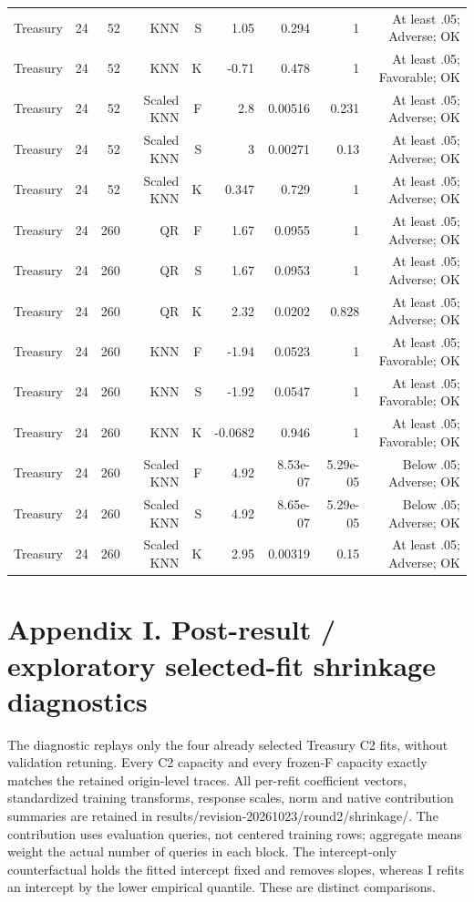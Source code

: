 \documentclass[10pt,a4paper]{article}
\begin{document}
\begin{center}
\begin{minipage}{\linewidth}
\begin{tabular}{lrrrrrrrr}
Treasury & 24 & 52 & KNN & S & 1.05 & 0.294 & 1 & At least .05; Adverse; OK \\
Treasury & 24 & 52 & KNN & K & -0.71 & 0.478 & 1 & At least .05; Favorable; OK \\
Treasury & 24 & 52 & Scaled KNN & F & 2.8 & 0.00516 & 0.231 & At least .05; Adverse; OK \\
Treasury & 24 & 52 & Scaled KNN & S & 3 & 0.00271 & 0.13 & At least .05; Adverse; OK \\
Treasury & 24 & 52 & Scaled KNN & K & 0.347 & 0.729 & 1 & At least .05; Adverse; OK \\
Treasury & 24 & 260 & QR & F & 1.67 & 0.0955 & 1 & At least .05; Adverse; OK \\
Treasury & 24 & 260 & QR & S & 1.67 & 0.0953 & 1 & At least .05; Adverse; OK \\
Treasury & 24 & 260 & QR & K & 2.32 & 0.0202 & 0.828 & At least .05; Adverse; OK \\
Treasury & 24 & 260 & KNN & F & -1.94 & 0.0523 & 1 & At least .05; Favorable; OK \\
Treasury & 24 & 260 & KNN & S & -1.92 & 0.0547 & 1 & At least .05; Favorable; OK \\
Treasury & 24 & 260 & KNN & K & -0.0682 & 0.946 & 1 & At least .05; Favorable; OK \\
Treasury & 24 & 260 & Scaled KNN & F & 4.92 & 8.53e-07 & 5.29e-05 & Below .05; Adverse; OK \\
Treasury & 24 & 260 & Scaled KNN & S & 4.92 & 8.65e-07 & 5.29e-05 & Below .05; Adverse; OK \\
Treasury & 24 & 260 & Scaled KNN & K & 2.95 & 0.00319 & 0.15 & At least .05; Adverse; OK \\
\bottomrule
\end{tabular}
\end{minipage}
\end{center}
\section*{Appendix I. Post-result / exploratory selected-fit shrinkage diagnostics}
The diagnostic replays only the four already selected Treasury C2 fits, without validation retuning. Every C2 capacity and every frozen-F capacity exactly matches the retained origin-level traces. All per-refit coefficient vectors, standardized training transforms, response scales, norm and native contribution summaries are retained in results/revision-20261023/round2/shrinkage/. The contribution uses evaluation queries, not centered training rows; aggregate means weight the actual number of queries in each block. The intercept-only counterfactual holds the fitted intercept fixed and removes slopes, whereas I refits an intercept by the lower empirical quantile. These are distinct comparisons.
\end{document}
